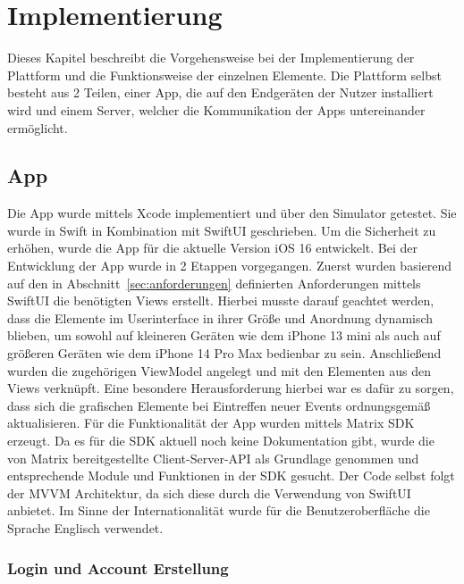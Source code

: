     \newpage
    \chapter{Implementierung}\label{ch:implementierung}
    Dieses Kapitel beschreibt die Vorgehensweise bei der Implementierung der Plattform und die Funktionsweise der einzelnen Elemente.
    Die Plattform selbst besteht aus 2 Teilen, einer App, die auf den Endgeräten der Nutzer installiert wird und einem Server, welcher die Kommunikation der Apps untereinander ermöglicht.


    \section{App}\label{sec:app}
    Die App wurde mittels Xcode implementiert und über den Simulator getestet.
    Sie wurde in Swift in Kombination mit SwiftUI geschrieben.
    Um die Sicherheit zu erhöhen, wurde die App für die aktuelle Version iOS 16 entwickelt.
    Bei der Entwicklung der App wurde in 2 Etappen vorgegangen.
    Zuerst wurden basierend auf den in Abschnitt~\ref{sec:anforderungen} definierten Anforderungen mittels SwiftUI die benötigten Views erstellt.
    Hierbei musste darauf geachtet werden, dass die Elemente im Userinterface in ihrer Größe und Anordnung dynamisch blieben, um sowohl auf kleineren Geräten wie dem iPhone 13 mini als auch auf größeren Geräten wie dem iPhone 14 Pro Max bedienbar zu sein.
    Anschließend wurden die zugehörigen ViewModel angelegt und mit den Elementen aus den Views verknüpft.
    Eine besondere Herausforderung hierbei war es dafür zu sorgen, dass sich die grafischen Elemente bei Eintreffen neuer Events ordnungsgemäß aktualisieren.
    Für die Funktionalität der App wurden mittels Matrix SDK erzeugt.
    Da es für die SDK aktuell noch keine Dokumentation gibt, wurde die von Matrix bereitgestellte Client-Server-API als Grundlage genommen und entsprechende Module und Funktionen in der SDK gesucht.
    Der Code selbst folgt der MVVM Architektur, da sich diese durch die Verwendung von SwiftUI anbietet.
    Im Sinne der Internationalität wurde für die Benutzeroberfläche die Sprache Englisch verwendet.

    \newpage
    \subsection{Login und Account Erstellung}\label{subsec:login-und-account-erstellung}

